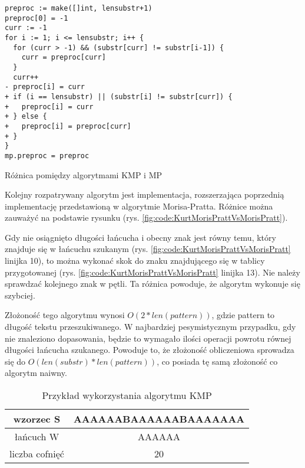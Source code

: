\begin{listing}[H]
    \begin{verbatim}
preproc := make([]int, lensubstr+1)
preproc[0] = -1
curr := -1
for i := 1; i <= lensubstr; i++ {
  for (curr > -1) && (substr[curr] != substr[i-1]) {
    curr = preproc[curr]
  }
  curr++
- preproc[i] = curr
+ if (i == lensubstr) || (substr[i] != substr[curr]) {
+   preproc[i] = curr
+ } else {
+   preproc[i] = preproc[curr]
+ }
}
mp.preproc = preproc
    \end{verbatim}
  \caption{Różnica pomiędzy algorytmami KMP i MP}
  \label{fig:code:KurtMorisPrattVsMorisPratt}
\end{listing}

Kolejny rozpatrywany algorytm jest implementacja, rozszerzająca poprzednią 
implementację przedstawioną w algorytmie Morisa-Pratta. Różnice można zauważyć na podstawie rysunku
(rys. \ref{fig:code:KurtMorisPrattVsMorisPratt}).

Gdy nie osiągnięto długości łańcucha i obecny znak jest równy temu, który 
znajduje się w łańcuchu szukanym (rys. \ref{fig:code:KurtMorisPrattVsMorisPratt}
linijka 10), to można wykonać skok do znaku znajdującego się w tablicy
przygotowanej (rys. \ref{fig:code:KurtMorisPrattVsMorisPratt} linijka 13).
Nie należy sprawdzać kolejnego znak w pętli. Ta różnica powoduje, że algorytm 
wykonuje się szybciej.

Złożoność tego algorytmu wynosi $O(2*{len(pattern)})$, gdzie pattern to długość
tekstu przeszukiwanego. W najbardziej pesymistycznym przypadku, gdy nie 
znaleziono dopasowania, będzie to wymagało ilości operacji powrotu równej długości 
łańcucha szukanego. Powoduje to, że złożoność obliczeniowa sprowadza się do
$O({len(substr)}*{len(pattern)})$, co posiada tę samą złożoność co algorytm naiwny. 

\begin{table}[hbtp]
  \centering
  \begin{tabular}{ |c|c|  } 
    \hline
    wzorzec S & AAAAAABAAAAAABAAAAAAA \\
    \hline
    łańcuch W & AAAAAA \\
    \hline
    liczba cofnięć & 20 \\
    \hline
  \end{tabular}
  \caption{Przykład wykorzystania algorytmu KMP}
  \label{tabela:KMPExampleSlow}
\end{table}

